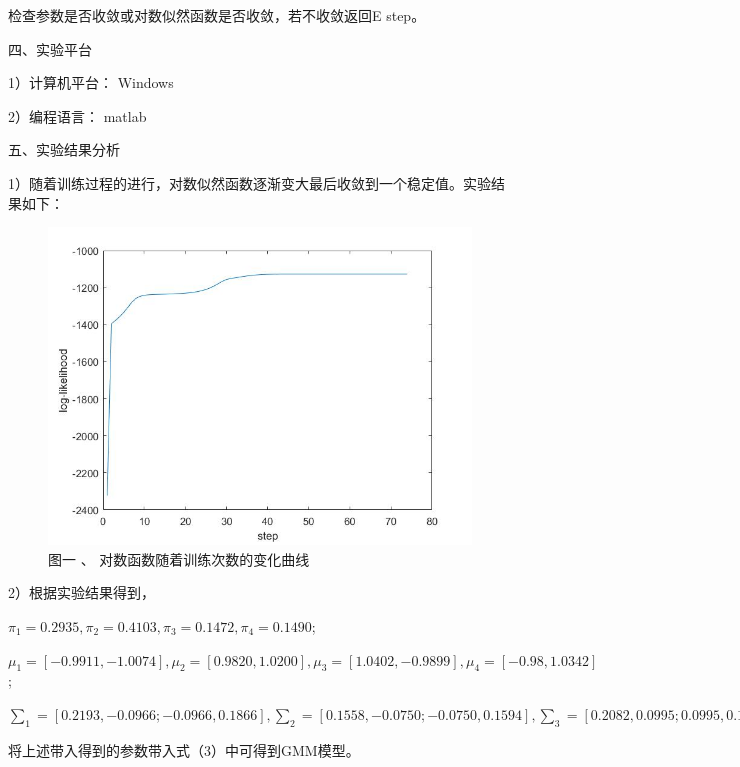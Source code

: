 \documentclass[bachelor]{ctexart}
\begin{document}
检查参数是否收敛或对数似然函数是否收敛，若不收敛返回E step。

四、实验平台

1）计算机平台： Windows

2）编程语言： matlab

五、实验结果分析

1）随着训练过程的进行，对数似然函数逐渐变大最后收敛到一个稳定值。实验结果如下：
\begin{figure}[!htb]
  \centering
  \includegraphics[scale=0.45]{figure1.jpg}\\
  {\footnotesize 图一 、   对数函数随着训练次数的变化曲线}\\
\end{figure}

2）根据实验结果得到，

$\pi_1 = 0.2935, \pi_2 = 0.4103, \pi_3 = 0.1472, \pi_4 = 0.1490$;

$\mu_1 = [-0.9911, -1.0074], \mu_2 = [0.9820, 1.0200], \mu_3 = [1.0402, -0.9899], \mu_4 = [-0.98, 1.0342]$;

${\sum}_1 = [0.2193, -0.0966; -0.0966, 0.1866], {\sum}_2 = [0.1558, -0.0750; -0.0750, 0.1594], {\sum}_3 = [0.2082, 0.0995; 0.0995, 0.1977], {\sum}_4 = [0.2319, 0.1044; 0.1044, 0.1958]$

将上述带入得到的参数带入式（3）中可得到GMM模型。
\end{document}
